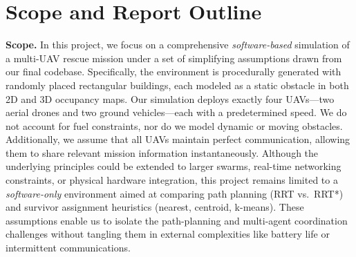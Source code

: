 \documentclass[12pt,a4paper]{report}
\begin{document}
\section{Scope and Report Outline}

\textbf{Scope.} In this project, we focus on a comprehensive \emph{software-based} 
simulation of a multi-UAV rescue mission under a set of simplifying assumptions drawn 
from our final codebase. Specifically, the environment is procedurally generated with 
randomly placed rectangular buildings, each modeled as a static obstacle in both 
2D and 3D occupancy maps. Our simulation deploys exactly four UAVs—two aerial drones 
and two ground vehicles—each with a predetermined speed. We do not account for 
fuel constraints, nor do we model dynamic or moving obstacles. Additionally, we assume 
that all UAVs maintain perfect communication, allowing them to share relevant mission 
information instantaneously. Although the underlying principles could be extended to 
larger swarms, real-time networking constraints, or physical hardware integration, this 
project remains limited to a \emph{software-only} environment aimed at comparing path 
planning (RRT vs.\ RRT*) and survivor assignment heuristics (nearest, centroid, k-means). 
These assumptions enable us to isolate the path-planning and multi-agent coordination 
challenges without tangling them in external complexities like battery life or 
intermittent communications.
\end{document}
